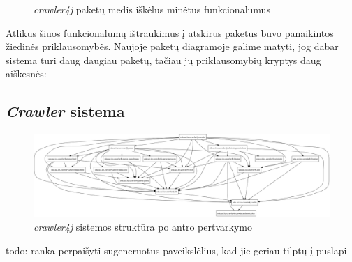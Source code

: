 \begin{figure}[H]
    \snugshade
    \endsnugshade
    \caption{\textit{crawler4j} paketų medis iškėlus minėtus funkcionalumus}
\end{figure}

Atlikus šiuos funkcionalumų ištraukimus į atskirus paketus buvo panaikintos žiedinės priklausomybės.
Naujoje paketų diagramoje galime matyti, jog dabar sistema turi daug daugiau paketų, tačiau jų priklausomybių kryptys daug aiškesnės:
\subsection{\textit{Crawler} sistema}
\begin{figure}[H]
    \centering
    \includegraphics[scale=0.2]{img/crawler_packages_v2}
    \caption{\textit{crawler4j} sistemos struktūra po antro pertvarkymo}
    \label{img:crawler_packages_v2}
\end{figure}
todo: ranka perpaišyti sugeneruotus paveikslėlius, kad jie geriau tilptų į puslapi


